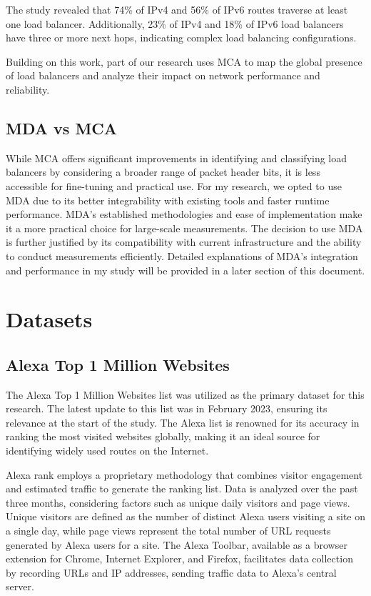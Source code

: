 \documentclass[12pt]{cwru_thesis}
\begin{document}
The study revealed that 74\% of IPv4 and 56\% of IPv6 routes traverse at least one load balancer. Additionally, 23\% of IPv4 and 18\% of IPv6 load balancers have three or more next hops, indicating complex load balancing configurations.

Building on this work, part of our research uses MCA to map the global presence of load balancers and analyze their impact on network performance and reliability. 

\section{MDA vs MCA}
While MCA offers significant improvements in identifying and classifying load balancers by considering a broader range of packet header bits, it is less accessible for fine-tuning and practical use. For my research, we opted to use MDA due to its better integrability with existing tools and faster runtime performance. MDA's established methodologies and ease of implementation make it a more practical choice for large-scale measurements. The decision to use MDA is further justified by its compatibility with current infrastructure and the ability to conduct measurements efficiently. Detailed explanations of MDA's integration and performance in my study will be provided in a later section of this document.



\chapter{Datasets}
\section{Alexa Top 1 Million Websites}

The Alexa Top 1 Million Websites list was utilized as the primary dataset for this research. The latest update to this list was in February 2023, ensuring its relevance at the start of the study. The Alexa list is renowned for its accuracy in ranking the most visited websites globally, making it an ideal source for identifying widely used routes on the Internet.

Alexa rank employs a proprietary methodology that combines visitor engagement and estimated traffic to generate the ranking list. Data is analyzed over the past three months, considering factors such as unique daily visitors and page views. Unique visitors are defined as the number of distinct Alexa users visiting a site on a single day, while page views represent the total number of URL requests generated by Alexa users for a site. The Alexa Toolbar, available as a browser extension for Chrome, Internet Explorer, and Firefox, facilitates data collection by recording URLs and IP addresses, sending traffic data to Alexa's central server.
\end{document}
